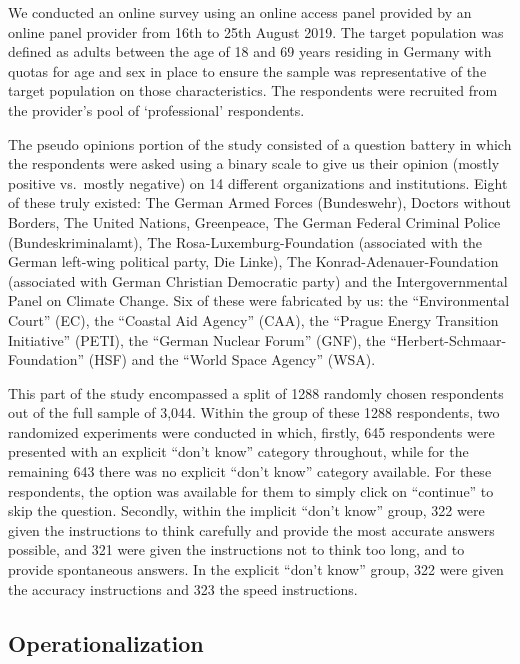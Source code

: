 \documentclass[Royal,times,sageh]{sagej}
\begin{document}
We conducted an online survey using an online access panel provided by
an online panel provider from 16th to 25th August 2019. The target
population was defined as adults between the age of 18 and 69 years
residing in Germany with quotas for age and sex in place to ensure the
sample was representative of the target population on those
characteristics. The respondents were recruited from the provider's pool
of `professional' respondents.

The pseudo opinions portion of the study consisted of a question battery
in which the respondents were asked using a binary scale to give us
their opinion (mostly positive vs.~mostly negative) on 14 different
organizations and institutions. Eight of these truly existed: The German
Armed Forces (Bundeswehr), Doctors without Borders, The United Nations,
Greenpeace, The German Federal Criminal Police (Bundeskriminalamt), The
Rosa-Luxemburg-Foundation (associated with the German left-wing
political party, Die Linke), The Konrad-Adenauer-Foundation (associated
with German Christian Democratic party) and the Intergovernmental Panel
on Climate Change. Six of these were fabricated by us: the
``Environmental Court'' (EC), the ``Coastal Aid Agency'' (CAA), the
``Prague Energy Transition Initiative'' (PETI), the ``German Nuclear
Forum'' (GNF), the ``Herbert-Schmaar-Foundation'' (HSF) and the ``World
Space Agency'' (WSA).

This part of the study encompassed a split of 1288 randomly chosen
respondents out of the full sample of 3,044. Within the group of these
1288 respondents, two randomized experiments were conducted in which,
firstly, 645 respondents were presented with an explicit ``don't know''
category throughout, while for the remaining 643 there was no explicit
``don't know'' category available. For these respondents, the option was
available for them to simply click on ``continue'' to skip the question.
Secondly, within the implicit ``don't know'' group, 322 were given the
instructions to think carefully and provide the most accurate answers
possible, and 321 were given the instructions not to think too long, and
to provide spontaneous answers. In the explicit ``don't know'' group,
322 were given the accuracy instructions and 323 the speed instructions.

\hypertarget{operationalization}{%
\subsection{Operationalization}\label{operationalization}}
\end{document}
